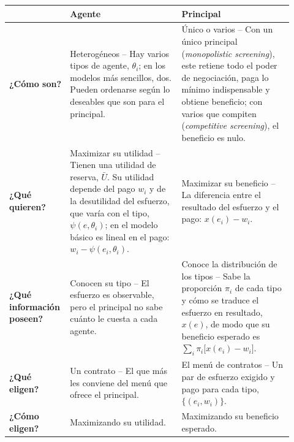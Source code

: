 \documentclass[10pt,a4paper]{article}
\begin{document}
\begin{center}
\renewcommand{\arraystretch}{1.25}
\setlength{\tabcolsep}{6pt}
\begin{tabular}{|p{0.16\linewidth}|p{0.38\linewidth}|p{0.38\linewidth}|}
\hline
 & \textbf{Agente} & \textbf{Principal} \\
\hline
\textbf{¿Cómo son?} &
Heterogéneos -- {\scriptsize Hay varios tipos de agente, $\theta_i$; en los modelos más sencillos, dos. Pueden ordenarse según lo deseables que son para el principal.} &
Único o varios -- {\scriptsize Con un único principal (\textit{monopolistic screening}), este retiene todo el poder de negociación, paga lo mínimo indispensable y obtiene beneficio; con varios que compiten (\textit{competitive screening}), el beneficio es nulo.} \\
\hline
\textbf{¿Qué quieren?} &
Maximizar su utilidad -- {\scriptsize Tienen una utilidad de reserva, $\bar U$. Su utilidad depende del pago $w_i$ y de la desutilidad del esfuerzo, que varía con el tipo, $\psi(e,\theta_i)$; en el modelo básico es lineal en el pago: $w_i-\psi(e_i,\theta_i)$.} &
Maximizar su beneficio -- {\scriptsize La diferencia entre el resultado del esfuerzo y el pago: $x(e_i)-w_i$.} \\
\hline
\textbf{¿Qué información poseen?} &
Conocen su tipo -- {\scriptsize El esfuerzo es observable, pero el principal no sabe cuánto le cuesta a cada agente.} &
Conoce la distribución de los tipos -- {\scriptsize Sabe la proporción $\pi_i$ de cada tipo y cómo se traduce el esfuerzo en resultado, $x(e)$, de modo que su beneficio esperado es $\sum_i\pi_i\big[x(e_i)-w_i\big]$.} \\
\hline
\textbf{¿Qué eligen?} &
Un contrato -- {\scriptsize El que más les conviene del menú que ofrece el principal.} &
El menú de contratos -- {\scriptsize Un par de esfuerzo exigido y pago para cada tipo, $\{(e_i,w_i)\}$.} \\
\hline
\textbf{¿Cómo eligen?} &
Maximizando su utilidad. &
Maximizando su beneficio esperado. \\
\hline
\end{tabular}
\end{center}
\end{document}

